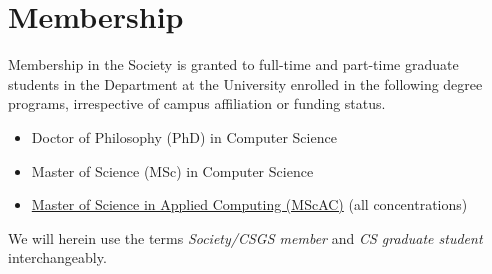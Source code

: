 \section{Membership}\label{sec:members}
Membership in the Society is granted to full-time and part-time graduate
students in the Department at the University enrolled in the following degree
programs, irrespective of campus affiliation or funding status.
\begin{itemize}
    \item Doctor of Philosophy (PhD) in Computer Science
    \item Master of Science (MSc) in Computer Science
    \item \href{https://mscac.utoronto.ca/}{Master of Science in Applied Computing (MScAC)} (all concentrations)
\end{itemize}
We will herein use the terms \textit{Society/CSGS member} and \textit{CS graduate student} interchangeably.